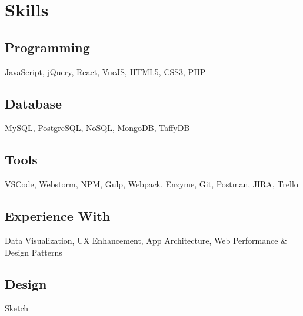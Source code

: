 \documentclass[]{gagan-resume}
\begin{document}






\begin{minipage}[t]{0.33\textwidth} 



\vspace{\topsep}
\section{Skills}
\subsection{Programming}
JavaScript, jQuery, React, VueJS, HTML5, CSS3, PHP
 \\
\subsection{Database}
MySQL, PostgreSQL, NoSQL, MongoDB, TaffyDB
 \\
\subsection{Tools}
VSCode, Webstorm, NPM, Gulp, Webpack, Enzyme, Git, Postman, JIRA, Trello
 \\
\subsection{Experience With}
Data Visualization, UX Enhancement, App Architecture, Web Performance \& Design Patterns
 \\
\subsection{Design}
Sketch
\sectionsep





\end{minipage}
\end{document}
